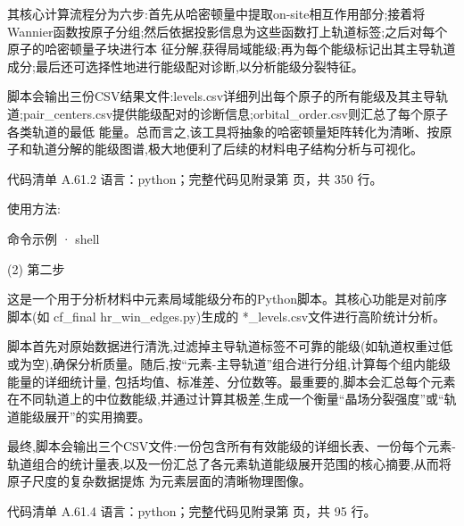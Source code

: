 \documentclass[lang=cn,scheme=chinese,color=blue,device=normal,toc=onecol,math=cm]{elegantbook}
\begin{document}
其核心计算流程分为六步:首先从哈密顿量中提取on-site相互作用部分;接着将Wannier函数按原子分组;然后依据投影信息为这些函数打上轨道标签;之后对每个原子的哈密顿量子块进行本 征分解,获得局域能级;再为每个能级标记出其主导轨道成分;最后还可选择性地进行能级配对诊断,以分析能级分裂特征。\par


脚本会输出三份CSV结果文件:levels.csv详细列出每个原子的所有能级及其主导轨道;pair\_\allowbreak{}centers.csv提供能级配对的诊断信息;orbital\_\allowbreak{}order.csv则汇总了每个原子各类轨道的最低 能量。总而言之,该工具将抽象的哈密顿量矩阵转化为清晰、按原子和轨道分解的能级图谱,极大地便利了后续的材料电子结构分析与可视化。\par


\begin{codeindexbox}{代码清单 A.61.2}
语言：python；完整代码见附录第 \pageref{code:61:2} 页，共 350 行。
\end{codeindexbox}


使用方法:\par


\begin{inlinecodebox}{命令示例 · shell}
\end{inlinecodebox}


(2) 第二步\par


这是一个用于分析材料中元素局域能级分布的Python脚本。其核心功能是对前序脚本(如 cf\_\allowbreak{}final hr\_\allowbreak{}win\_\allowbreak{}edges.py)生成的 *\_\allowbreak{}levels.csv文件进行高阶统计分析。\par


脚本首先对原始数据进行清洗,过滤掉主导轨道标签不可靠的能级(如轨道权重过低或为空),确保分析质量。随后,按“元素-主导轨道”组合进行分组,计算每个组内能级能量的详细统计量, 包括均值、标准差、分位数等。最重要的,脚本会汇总每个元素在不同轨道上的中位数能级,并通过计算其极差,生成一个衡量“晶场分裂强度”或“轨道能级展开”的实用摘要。\par


最终,脚本会输出三个CSV文件:一份包含所有有效能级的详细长表、一份每个元素-轨道组合的统计量表,以及一份汇总了各元素轨道能级展开范围的核心摘要,从而将原子尺度的复杂数据提炼 为元素层面的清晰物理图像。\par


\begin{codeindexbox}{代码清单 A.61.4}
语言：python；完整代码见附录第 \pageref{code:61:4} 页，共 95 行。
\end{codeindexbox}
\end{document}
